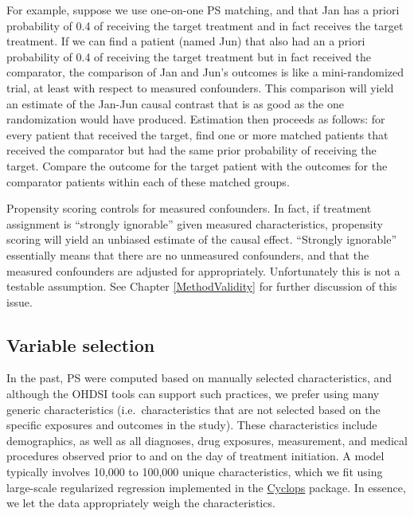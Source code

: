 \documentclass[11pt]{book}
\theoremstyle{definition}
\theoremstyle{definition}
\theoremstyle{definition}
\theoremstyle{remark}
\begin{document}
For example, suppose we use one-on-one PS matching, and that Jan has a priori probability of 0.4 of receiving the target treatment and in fact receives the target treatment. If we can find a patient (named Jun) that also had an a priori probability of 0.4 of receiving the target treatment but in fact received the comparator, the comparison of Jan and Jun's outcomes is like a mini-randomized trial, at least with respect to measured confounders. This comparison will yield an estimate of the Jan-Jun causal contrast that is as good as the one randomization would have produced. Estimation then proceeds as follows: for every patient that received the target, find one or more matched patients that received the comparator but had the same prior probability of receiving the target. Compare the outcome for the target patient with the outcomes for the comparator patients within each of these matched groups.

Propensity scoring controls for measured confounders. In fact, if treatment assignment is ``strongly ignorable'' given measured characteristics, propensity scoring will yield an unbiased estimate of the causal effect. ``Strongly ignorable'' essentially means that there are no unmeasured confounders, and that the measured confounders are adjusted for appropriately. Unfortunately this is not a testable assumption. See Chapter \ref{MethodValidity} for further discussion of this issue. 

\hypertarget{VariableSelection}{%
\subsection{Variable selection}\label{VariableSelection}}

In the past, PS were computed based on manually selected characteristics, and although the OHDSI tools can support such practices, we prefer using many generic characteristics (i.e.~characteristics that are not selected based on the specific exposures and outcomes in the study). \citep{tian_2018} These characteristics include demographics, as well as all diagnoses, drug exposures, measurement, and medical procedures observed prior to and on the day of treatment initiation. A model typically involves 10,000 to 100,000 unique characteristics, which we fit using large-scale regularized regression \citep{suchard_2013} implemented in the \href{https://ohdsi.github.io/Cyclops/}{Cyclops} package. In essence, we let the data appropriately weigh the characteristics.
\end{document}
